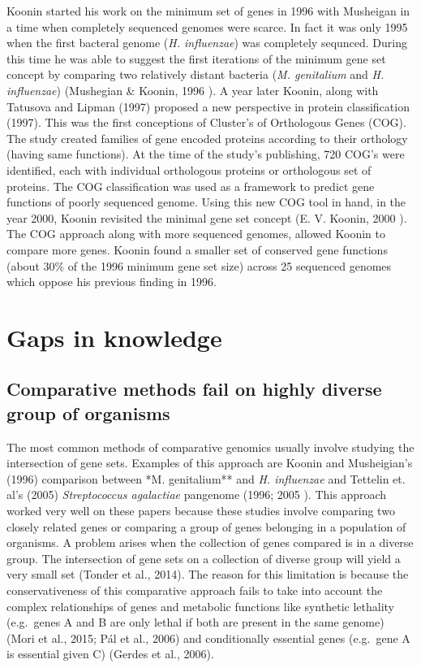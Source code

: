 \documentclass[]{report}
\begin{document}
Koonin started his work on the minimum set of genes in 1996 with
Musheigan in a time when completely sequenced genomes were scarce. In
fact it was only 1995 when the first bacteral genome (\emph{H.
influenzae}) was completely sequnced. During this time he was able to
suggest the first iterations of the minimum gene set concept by
comparing two relatively distant bacteria (\emph{M. genitalium} and
\emph{H. influenzae}) (Mushegian \& Koonin, 1996 ). A year later Koonin,
along with Tatusova and Lipman (1997) proposed a new perspective in
protein classification (1997). This was the first conceptions of
Cluster's of Orthologous Genes (COG). The study created families of gene
encoded proteins according to their orthology (having same functions).
At the time of the study's publishing, 720 COG's were identified, each
with individual orthologous proteins or orthologous set of proteins. The
COG classification was used as a framework to predict gene functions of
poorly sequenced genome. Using this new COG tool in hand, in the year
2000, Koonin revisited the minimal gene set concept (E. V. Koonin, 2000
). The COG approach along with more sequenced genomes, allowed Koonin to
compare more genes. Koonin found a smaller set of conserved gene
functions (about 30\% of the 1996 minimum gene set size) across 25
sequenced genomes which oppose his previous finding in 1996.

\section{Gaps in knowledge}\label{gaps-in-knowledge}

\subsection{Comparative methods fail on highly diverse group of
organisms}\label{comparative-methods-fail-on-highly-diverse-group-of-organisms}

The most common methods of comparative genomics usually involve studying
the intersection of gene sets. Examples of this approach are Koonin and
Musheigian's (1996) comparison between *M. genitalium** and \emph{H.
influenzae} and Tettelin et. al's (2005) \emph{Streptococcus agalactiae}
pangenome (1996; 2005 ). This approach worked very well on these papers
because these studies involve comparing two closely related genes or
comparing a group of genes belonging in a population of organisms. A
problem arises when the collection of genes compared is in a diverse
group. The intersection of gene sets on a collection of diverse group
will yield a very small set (Tonder et al., 2014). The reason for this
limitation is because the conservativeness of this comparative approach
fails to take into account the complex relationships of genes and
metabolic functions like synthetic lethality (e.g.~genes A and B are
only lethal if both are present in the same genome) (Mori et al., 2015;
Pál et al., 2006) and conditionally essential genes (e.g.~gene A is
essential given C) (Gerdes et al., 2006).
\end{document}
